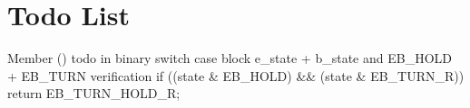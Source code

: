 \chapter{Todo List}
\hypertarget{todo}{}\label{todo}

\begin{DoxyRefList}
\item[Member \doxylink{class_virt_enc_button_a889370afd906746fa5866298cf4cc30d}{Virt\+Enc\+Button\+::action} ()]\label{todo__todo000001}%
%
todo in binary switch case block e\+\_\+state + b\+\_\+state and EB\+\_\+\+HOLD + EB\+\_\+\+TURN verification if ((state \& EB\+\_\+\+HOLD) \&\& (state \& EB\+\_\+\+TURN\+\_\+R)) return EB\+\_\+\+TURN\+\_\+\+HOLD\+\_\+R; 
\end{DoxyRefList}